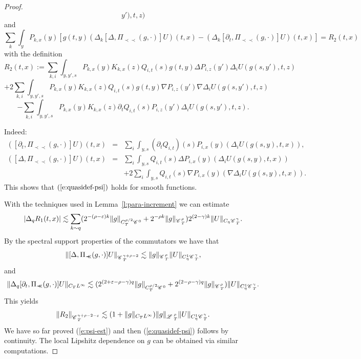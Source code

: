 \documentclass{amsart}
\newcommand{\assign}{:=}
\newcommand{\precprec}{\prec\!\!\!\prec}
\theoremstyle{remark}
\theoremstyle{definition}
\newcommand{\CC}{\mathscr{C} \hspace{.1em}}
\newcommand{\LL}{\mathscr{L} \hspace{.2em}}
\begin{document}
\begin{proof}
\begin{equation}
    y'), t, z) \label{e:rem-1}
  \end{equation}
  and
  \[ \sum_k \int_y P_{k, x} (y) [g (t, y) (\Delta_k [\Delta, \Pi_{\precprec}
     (g, \cdot)] U) (t, x) - (\Delta_k [\partial_t, \Pi_{\precprec} (g,
     \cdot)] U) (t, x)] = R_2 (t, x) \]
  with the definition
  \[ R_2 (t, x) \assign \sum_{k, i} \int_{y, y', s} P_{k, x} (y) K_{k, x} (z)
     Q_{i, t} (s) g (t, y) \Delta P_{i, z} (y') \Delta_i U (g (s, y'), t, z)
  \]
  \[ + 2 \sum_{k, i} \int_{y, y', s} P_{k, x} (y) K_{k, x} (z) Q_{i, t} (s) g
     (t, y) \nabla P_{i, z} (y') \nabla \Delta_i U (g (s, y'), t, z) \]
  \begin{equation}
    - \sum_{k, i} \int_{y, y', s} P_{k, x} (y) K_{k, x} (z) \partial_t Q_{i,
    t} (s) P_{i, z} (y') \Delta_i U (g (s, y'), t, z) . \label{e:rem-2}
  \end{equation}
  
  
  Indeed:
  \begin{eqnarray}
    ([\partial_t, \Pi_{\precprec} (g, \cdot)] U) (t, x) & = & \sum_i \int_{y,
    s} (\partial_t Q_{i, t}) (s) P_{i, x} (y) (\Delta_i U (g (s, y), t, x)),
    \nonumber\\
    ([\Delta, \Pi_{\precprec} (g, \cdot)] U) (t, x) & = & \sum_i \int_{y, s}
    Q_{i, t} (s) \Delta P_{i, x} (y) (\Delta_i U (g (s, y), t, x)) 
    \label{eq:q-time}\\
    &  & + 2 \sum_i \int_{y, s} Q_{i, t} (s) \nabla P_{i, x} (y) (\nabla
    \Delta_i U (g (s, y), t, x)) . \nonumber
  \end{eqnarray}
  This shows that $(\ref{e:quasidef-psi})$ holds for smooth functions.
  
  With the techniques used in Lemma~\ref{l:para-increment} we can estimate
  \[ | \Delta_q R_1 (t, x) | \lesssim \sum_{k \sim q} (2^{- (\rho -
     \varepsilon) k} \| g \|_{C_T^{\rho / 2} \CC^0} + 2^{- \rho k} \| g
     \|_{\CC^{\rho}_T}) 2^{(2 - \gamma) k} \| U \|_{C_{\eta} \CC^{\gamma}_T} .
  \]
  By the spectral support properties of the commutators we have that
  \[ \| [\Delta, \Pi_{\precprec} (g, \cdot)] U \|_{\CC_T^{\gamma + \rho - 2}}
     \lesssim \| g \|_{\CC^{\rho}_T} \| U \|_{C^1_{\eta} \CC^{\gamma}_T}, \]
  and
  \[ \| \Delta_q [\partial_t, \Pi_{\precprec} (g, \cdot)] U \|_{C_T
     L^{\infty}} \lesssim (2^{(2 + \varepsilon - \rho - \gamma) q} \| g
     \|_{C_T^{\rho / 2} \CC^0} + 2^{(2 - \rho - \gamma) q} \| g
     \|_{\CC^{\rho}_T}) \| U \|_{C^1_{\eta} \CC^{\gamma}_T} . \]
  This yields
  \[ \| R_2 \|_{\CC_T^{\gamma + \rho - 2 - \varepsilon}} \lesssim (1 + \| g
     \|_{C_T L^{\infty}}) \| g \|_{\LL^{\rho}_T} \| U \|_{C^1_{\eta}
     \CC^{\gamma}_T} . \]
  We have so far proved (\ref{e:psi-est}) and then (\ref{e:quasidef-psi})
  follows by continuity. The local Lipshitz dependence on $g$ can be obtained
  via similar computations.
\end{proof}
\end{document}
